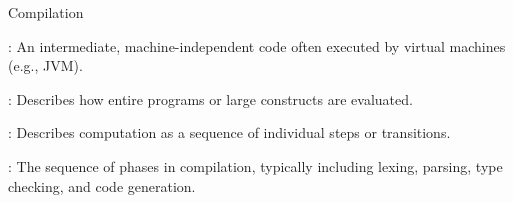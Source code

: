 \documentclass[hidelinks]{article}
\begin{document}
\begin{smodule}[title={Compilation Phases}]{Compilation}
    \begin{sdefinition}[for=Bytecode]
        : An intermediate, machine-independent code often executed by virtual machines (e.g., JVM).
    \end{sdefinition}
    
    \begin{sdefinition}[for=BigStepSemantics]
        : Describes how entire programs or large constructs are evaluated.
    \end{sdefinition}
    
    \begin{sdefinition}[for=SmallStepSemantics]
        : Describes computation as a sequence of individual steps or transitions.
    \end{sdefinition}
    
    \begin{sdefinition}[for=CompilationPipeline]
        : The sequence of phases in compilation, typically including lexing, parsing, type checking, and code generation.
    \end{sdefinition}
\end{smodule}
	
\end{document}

